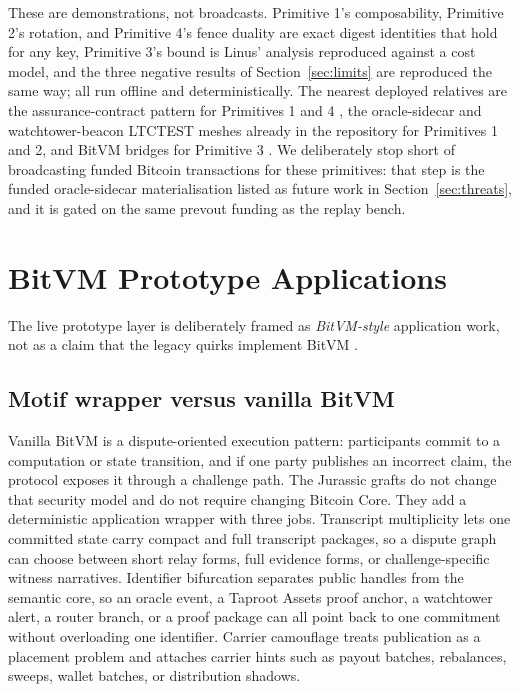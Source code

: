 \documentclass[11pt]{article}
\begin{document}
These are demonstrations, not broadcasts. Primitive 1's composability,
Primitive 2's rotation, and Primitive 4's fence duality are exact digest
identities that hold for any key, Primitive 3's bound is Linus' analysis
reproduced against a cost model, and the three negative results of
Section~\ref{sec:limits} are reproduced the same way; all run offline and
deterministically. The nearest deployed relatives are the assurance-contract
pattern for Primitives 1 and 4 \cite{bitcoinwiki_contracts}, the oracle-sidecar
and watchtower-beacon LTCTEST meshes already in the repository for Primitives 1
and 2, and BitVM bridges for Primitive 3 \cite{linus2025bitvm2}. We deliberately
stop short of broadcasting funded Bitcoin transactions for these primitives: that
step is the funded oracle-sidecar materialisation listed as future work in
Section~\ref{sec:threats}, and it is gated on the same prevout funding as the
replay bench.

\section{BitVM Prototype Applications}
\label{sec:bitvm}

The live prototype layer is deliberately framed as \emph{BitVM-style}
application work, not as a claim that the legacy quirks implement BitVM
\cite{linus2023bitvm}.

\subsection{Motif wrapper versus vanilla BitVM}

Vanilla BitVM is a dispute-oriented execution pattern: participants commit to a
computation or state transition, and if one party publishes an incorrect claim,
the protocol exposes it through a challenge path. The Jurassic grafts do not
change that security model and do not require changing Bitcoin Core. They add a
deterministic application wrapper with three jobs. Transcript multiplicity lets
one committed state carry compact and full transcript packages, so a dispute
graph can choose between short relay forms, full evidence forms, or
challenge-specific witness narratives. Identifier bifurcation separates public
handles from the semantic core, so an oracle event, a Taproot Assets proof
anchor, a watchtower alert, a router branch, or a proof package can all point
back to one commitment without overloading one identifier. Carrier camouflage
treats publication as a placement problem and attaches carrier hints such as
payout batches, rebalances, sweeps, wallet batches, or distribution shadows.
\end{document}
